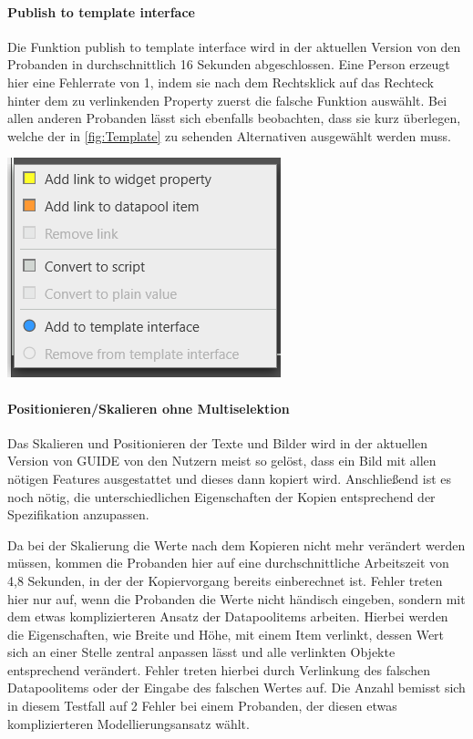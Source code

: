 \paragraph{Publish to template interface}
Die Funktion \glqq publish to template interface\grqq{} wird in der aktuellen Version von den Probanden in durchschnittlich 16 Sekunden abgeschlossen.
Eine Person erzeugt hier eine Fehlerrate von 1, indem sie nach dem Rechtsklick auf das Rechteck hinter dem zu verlinkenden Property zuerst die falsche Funktion auswählt.
Bei allen anderen Probanden lässt sich ebenfalls beobachten, dass sie kurz überlegen, welche der in \cref{fig:Template} zu sehenden Alternativen ausgewählt werden muss.
\begin{center}
  \includegraphics[scale= 0.8]{figures/Template.PNG}
  \label{fig:Template}
\end{center}

\paragraph{Positionieren/Skalieren ohne Multiselektion}
Das Skalieren und Positionieren der Texte und Bilder wird in der aktuellen Version von GUIDE  von den Nutzern meist so gelöst, dass ein Bild mit allen nötigen Features ausgestattet und dieses dann kopiert wird.
Anschließend ist es noch nötig, die unterschiedlichen Eigenschaften der Kopien entsprechend der Spezifikation anzupassen.

Da bei der Skalierung die Werte nach dem Kopieren nicht mehr verändert werden müssen, kommen die Probanden hier auf eine durchschnittliche Arbeitszeit von 4,8 Sekunden, in der der Kopiervorgang bereits einberechnet ist.
Fehler treten hier nur auf, wenn die Probanden die Werte nicht händisch eingeben, sondern mit dem etwas komplizierteren Ansatz der Datapoolitems arbeiten.
Hierbei werden die Eigenschaften, wie Breite und Höhe, mit einem Item verlinkt, dessen Wert sich an einer Stelle zentral anpassen lässt und alle verlinkten Objekte entsprechend verändert.
Fehler treten hierbei durch Verlinkung des falschen Datapoolitems oder der Eingabe des falschen Wertes auf.
Die Anzahl bemisst sich in diesem Testfall auf 2 Fehler bei einem Probanden, der diesen etwas komplizierteren Modellierungsansatz wählt.

